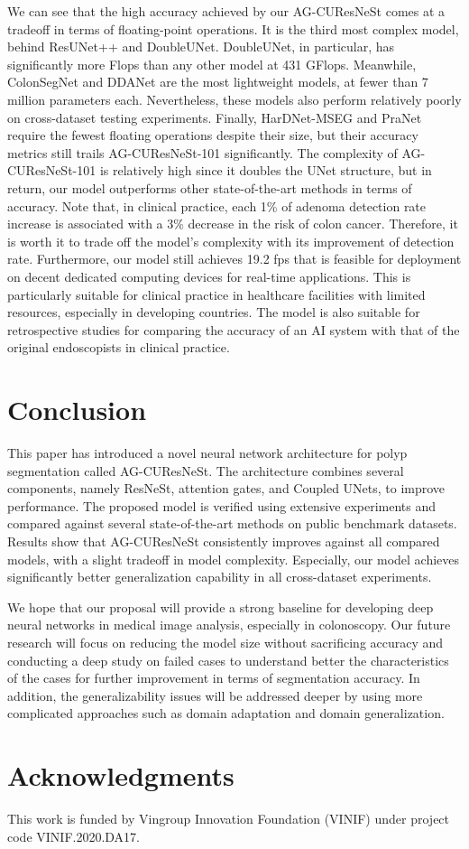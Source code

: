 \documentclass[review, sort&compress]{elsarticle}
\begin{document}
We can see that the high accuracy achieved by our AG-CUResNeSt comes at a tradeoff in terms of floating-point operations. It is the third most complex model, behind ResUNet++ and DoubleUNet. DoubleUNet, in particular, has significantly more Flops than any other model at 431 GFlops. Meanwhile, ColonSegNet and DDANet are the most lightweight models, at fewer than 7 million parameters each. Nevertheless, these models also perform relatively poorly on cross-dataset testing experiments. Finally, HarDNet-MSEG and PraNet require the fewest floating operations despite their size, but their accuracy metrics still trails AG-CUResNeSt-101 significantly.
The complexity of AG-CUResNeSt-101 is relatively high since it doubles the UNet structure, but in return, our model outperforms other state-of-the-art methods in terms of accuracy. Note that, in clinical practice, each 1\% of adenoma detection rate increase is associated with a 3\% decrease in the risk of colon cancer. Therefore, it is worth it to trade off the model's complexity with its improvement of detection rate. Furthermore, our model still achieves 19.2 fps that is feasible for deployment on decent dedicated computing devices for real-time applications. This is particularly suitable for clinical practice in healthcare facilities with limited resources, especially in developing countries. The model is also suitable for retrospective studies for comparing the accuracy of an AI system with that of the original endoscopists in clinical practice.

\section{Conclusion}
\label{sec:conclude}
This paper has introduced a novel neural network architecture for polyp segmentation called AG-CUResNeSt. The architecture combines several components, namely ResNeSt, attention gates, and Coupled UNets, to improve performance. The proposed model is verified using extensive experiments and compared against several state-of-the-art methods on public benchmark datasets. Results show that AG-CUResNeSt consistently improves against all compared models, with a slight tradeoff in model complexity. Especially, our model achieves significantly better generalization capability in all cross-dataset experiments.

We hope that our proposal will provide a strong baseline for developing deep neural networks in medical image analysis, especially in colonoscopy. Our future research will focus on reducing the model size without sacrificing accuracy and conducting a deep study on failed cases to understand better the characteristics of the cases for further improvement in terms of segmentation accuracy. In addition, the generalizability issues will be addressed deeper by using more complicated approaches such as domain adaptation and domain generalization. 

\section{Acknowledgments}
This work is funded by Vingroup Innovation Foundation (VINIF) under project code VINIF.2020.DA17.


\end{document}
